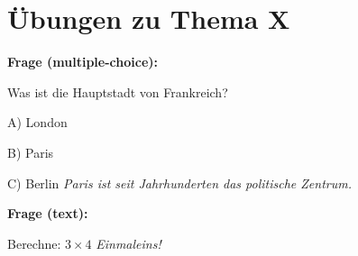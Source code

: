 \documentclass{article}
\newenvironment{question}[2]{
    \textbf{Frage (#1):} 
}{}
\newcommand{\explanation}[1]{\textit{#1}}
\begin{document}
\section*{Übungen zu Thema X}

\begin{question}{multiple-choice}{B}
    Was ist die Hauptstadt von Frankreich?
    \item A) London
    \item B) Paris
    \item C) Berlin
    \explanation{Paris ist seit Jahrhunderten das politische Zentrum.}
\end{question}

\begin{question}{text}{12}
    Berechne: $3 \times 4$
    \explanation{Einmaleins!}
\end{question}
\end{document}
